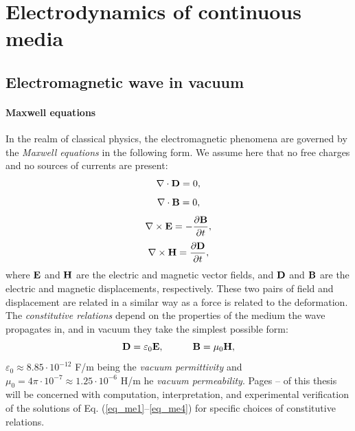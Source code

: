 
\section{Electrodynamics of continuous media} 
\subsection{Electromagnetic wave in vacuum}
\paragraph{Maxwell equations}  %
In the realm of classical physics, the electromagnetic phenomena are governed by the \textit{Maxwell equations} in the following form.
We assume here that no free charges and no sources of currents are present: 
\begin{equation} \nabla \cdot  \mathbf{D} = 0, \label{eq_me1}\end{equation}  
\begin{equation} \nabla \cdot  \mathbf{B} = 0, \label{eq_me2}\end{equation}  
\begin{equation} \nabla \times \mathbf{E} = -\frac{\partial \mathbf{B}} {\partial t}, \label{eq_me3}\end{equation}  
\begin{equation} \nabla \times \mathbf{H} =  \frac{\partial \mathbf{D}} {\partial t}, \label{eq_me4}\end{equation}  
where $\mathbf{E}$ and $\mathbf{H}$ are the electric and magnetic vector fields, and $\mathbf{D}$ and $\mathbf{B}$ are the electric and magnetic displacements,
 respectively. These two pairs of field and displacement are related in a similar way as a force is related to the deformation. %
 The \textit{constitutive relations} depend on the properties of the medium the wave propagates in, and in vacuum they take the simplest possible form:
\begin{equation}		\mathbf{D} = \varepsilon_0	\mathbf{E}, \quad\quad\quad						\mathbf{B} = \mu_0			\mathbf{H},				 \label{eq_ce}\end{equation}
$\varepsilon_0 \approx 8.85\cdot10^{-12}$ F/m being the \textit{vacuum permittivity} and $\mu_0 = 4\pi \cdot 10^{-7} \approx 1.25\cdot10^{-6}$ H/m he \textit{vacuum permeability}. 
Pages \pageref{starttext}--\pageref{endtext} of this thesis will be concerned with computation, interpretation, and experimental verification of the solutions of Eq. (\ref{eq_me1}--\ref{eq_me4})  for specific choices of constitutive relations.
